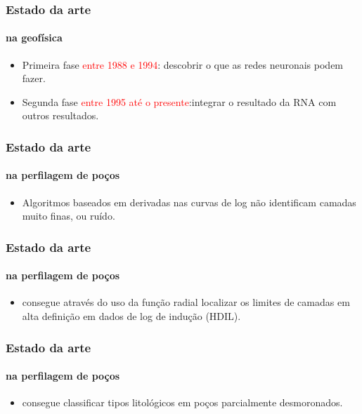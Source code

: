 \documentclass[aspectratio=10]{beamer} %
\begin{document}
\begin{frame}
\frametitle{Estado da arte}
\framesubtitle{na geofísica}
\begin{itemize}
\item Primeira fase \textcolor{red}{entre 1988 e 1994}: descobrir o que as redes neuronais podem fazer. 
\pause
\item Segunda fase \textcolor{red}{entre 1995 até o presente}:integrar o resultado da RNA com outros resultados.
\end{itemize}

\begin{flushleft}
\citep{Poulton2002, Artero2009}
\end{flushleft}

\end{frame}

\begin{frame}
\frametitle{Estado da arte}
\framesubtitle{na perfilagem de poços}
\begin{small}
\end{small}
\begin{itemize}
\item Algoritmos baseados em derivadas nas curvas de log não identificam camadas muito finas, ou ruído.
\end{itemize}
\end{frame}

\begin{frame}
\frametitle{Estado da arte}
\framesubtitle{na perfilagem de poços}
\begin{small}
\end{small}
\begin{itemize}
\item consegue através do uso da função radial localizar os limites de camadas em alta definição em dados de log de indução (HDIL).
\end{itemize}
\end{frame}

\begin{frame}
\frametitle{Estado da arte}
\framesubtitle{na perfilagem de poços}
\begin{small}
\end{small}
\begin{itemize}
\item consegue classificar tipos litológicos em poços parcialmente desmoronados.
\end{itemize}
\end{frame}
\end{document}
